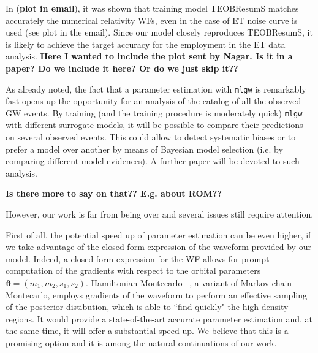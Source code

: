 In \cite{} (\textbf{plot in email}), it was shown that training model TEOBResumS matches accurately the numerical relativity WFs, even in the case of ET noise curve is used (see plot in the email). Since our model closely reproduces TEOBResumS, it is likely to achieve the target accuracy for the employment in the ET data analysis.
\textbf{Here I wanted to include the plot sent by Nagar. Is it in a paper? Do we include it here? Or do we just skip it??}
\par
As already noted, the fact that a parameter estimation with \texttt{mlgw} is remarkably fast opens up the opportunity for an analysis of the catalog of all the observed GW events.
By training (and the training procedure is moderately quick) \texttt{mlgw} with different surrogate models, it will be possible to compare their predictions on several observed events. This could allow to detect systematic biases or to prefer a model over another by means of Bayesian model selection (i.e. by comparing different model evidences).
A further paper will be devoted to such analysis.
\par
\textbf{Is there more to say on that?? E.g. about ROM??}\\
\par
However, our work is far from being over and several issues still require attention.
\par
First of all, the potential speed up of parameter estimation can be even higher, if we take advantage of the closed form expression of the waveform provided by our model.
Indeed, a closed form expression for the WF allows for prompt computation of the gradients with respect to the orbital parameters $ \boldsymbol{\vartheta} = (m_1,m_2, {s}_1,{s}_2) $.
Hamiltonian Montecarlo \cite{betancourt2017hamiltonianMC}~\cite{Porter2014Hamiltonian_MonteCarlo}, a variant of Markov chain Montecarlo, employs gradients of the waveform to perform an effective sampling of the posterior distibution, which is able to ``find quickly" the high density regions.
It would provide a state-of-the-art accurate parameter estimation and, at the same time, it will offer a substantial speed up.
We believe that this is a promising option and it is among the natural continuations of our work.
